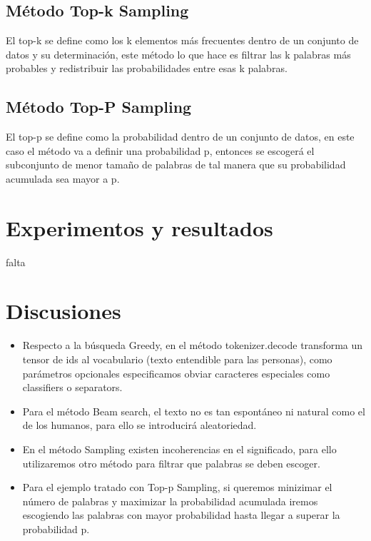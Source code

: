 \documentclass[10pt,twocolumn]{article}
\theoremstyle{definition}
\begin{document}
\subsection{Método Top-k Sampling}
El top-k se define como los k elementos más frecuentes dentro de un conjunto de datos y su determinación, este método lo que hace es filtrar las  k palabras más probables y redistribuir las probabilidades entre esas k palabras.

\subsection{Método Top-P Sampling}
El top-p se define como la probabilidad dentro de un conjunto de datos, en este caso el método va a definir una probabilidad p, entonces se escogerá el subconjunto de menor tamaño de palabras de tal manera que su probabilidad acumulada sea mayor a p.

\section{Experimentos y resultados}
falta

\section{Discusiones}
\begin{itemize}
    \item Respecto a la búsqueda Greedy, en el método tokenizer.decode transforma un tensor de ids al vocabulario (texto entendible para las personas), como parámetros opcionales especificamos obviar caracteres especiales como classifiers o separators.
    \item Para el método Beam search, el texto no es tan espontáneo ni natural como el de los humanos, para ello se introducirá aleatoriedad.
    \item En el método Sampling existen incoherencias en el significado, para ello utilizaremos otro método para filtrar que palabras se deben escoger.  
    \item Para el ejemplo tratado con Top-p Sampling, si queremos minizimar el número de palabras y maximizar la probabilidad acumulada iremos escogiendo las palabras con mayor probabilidad hasta llegar a superar la probabilidad p.
    
\end{itemize}
\end{document}
